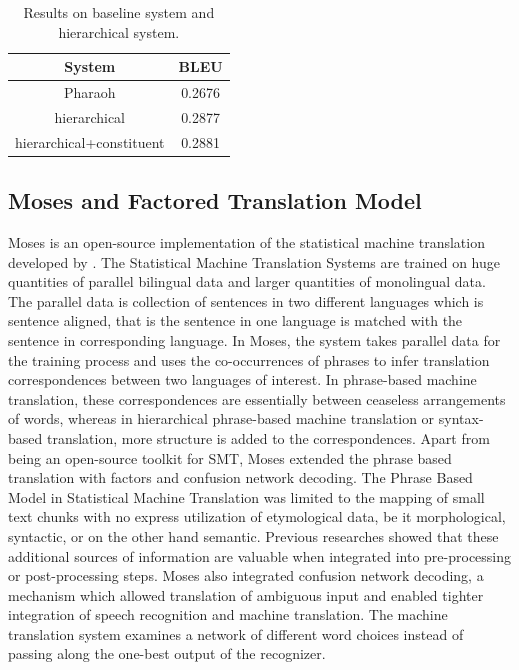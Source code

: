 \begin{table}[h]
\centering
\begin{tabular}{ |c|c| } 
 \hline System & BLEU  \\
 \hline
 Pharaoh & 0.2676  \\ 
 hierarchical & 0.2877 \\ 
  hierarchical+constituent & 0.2881 \\ 
 \hline
\end{tabular}
\caption{Results on baseline system and hierarchical system. \cite{Chiang:2005:HPM:1219840.1219873}}\label{hbmtt}
\end{table}

\subsection{Moses and Factored Translation Model}
Moses is an open-source implementation of the statistical machine translation developed by \cite{Koehn:2007:MOS:1557769.1557821}. The Statistical Machine Translation Systems are trained on huge quantities of parallel bilingual data and larger quantities of monolingual data. The parallel data is collection of sentences in two different languages which is sentence aligned, that is the sentence in one language is matched with the sentence in corresponding language. In Moses, the system takes parallel data for the training process and uses the co-occurrences of phrases to infer translation correspondences between two languages of interest. In phrase-based machine translation, these correspondences are essentially between ceaseless arrangements of words, whereas in hierarchical phrase-based machine translation or syntax-based translation, more structure is added to the correspondences. Apart from being an open-source toolkit for SMT, Moses extended the phrase based translation with factors and confusion network decoding. The Phrase Based Model in Statistical Machine Translation was limited to the mapping of small text chunks with no express utilization of etymological data, be it morphological, syntactic, 
or on the other hand semantic. Previous researches showed that these additional sources of information are valuable when integrated into pre-processing or post-processing steps. Moses also integrated confusion network decoding, a mechanism which allowed translation of ambiguous input and enabled tighter integration of speech recognition and machine translation. The machine translation system examines a network of different word choices instead of passing along the one-best output of the recognizer. 
